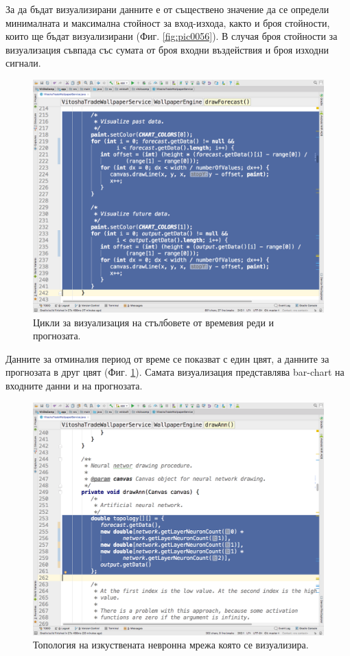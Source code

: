 \documentclass[book,14pt,oneside,openany]{memoir}
\begin{document}
За да бъдат визуализирани данните е от съществено значение да се определи минималната и максимална стойност за вход-изхода, както и броя стойности, които ще бъдат визуализирани (Фиг. \ref{fig:pic0056}). В случая броя стойности за визуализация съвпада със сумата от броя входни въздействия и броя изходни сигнали. 

\begin{figure}[h]
  \centering
  \includegraphics[height=0.45\pdfpageheight]{pic0057}
  \caption{Цикли за визуализация на стълбовете от времевия реди и прогнозата.}
\label{fig:pic0057}
\end{figure}
\FloatBarrier

Данните за отминалия период от време се показват с един цвят, а данните за прогнозата в друг цвят (Фиг. \ref{fig:pic0057}). Самата визуализация представлява bar-chart на входните данни и на прогнозата. 

\begin{figure}[h]
  \centering
  \includegraphics[height=0.45\pdfpageheight]{pic0058}
  \caption{Топология на изкуствената невронна мрежа която се визуализира.}
\label{fig:pic0058}
\end{figure}
\FloatBarrier
\end{document}
